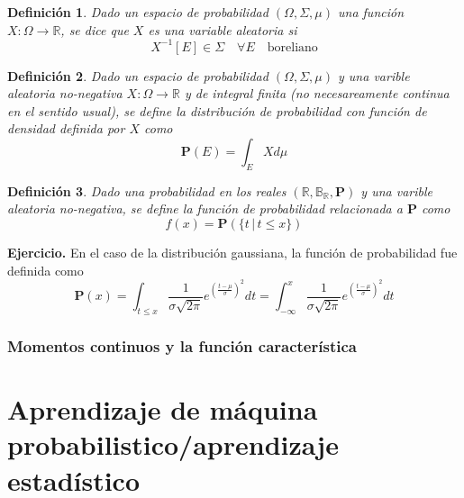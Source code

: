 \documentclass[letterpaper]{book}
\newtheorem{def.}{Definici\'on}[section]
\newcommand{\prob}{\textbf{P}}
\newcommand{\eje}{{\newline \noindent \sc \textbf{Ejercicio. }}}
\newcommand{\om}{\ensuremath{\Omega}}
\newcommand{\sig}{\ensuremath{\Sigma}}
\newcommand{\re}{\ensuremath{\mathbb R }}
\begin{document}
\begin{def.}
Dado un espacio de probabilidad \((\om,\sig,\mu)\) una función \(X:\om\rightarrow \re\), se dice que \(X\) es una variable aleatoria si
\[
    X^{-1}[E]\in\sig\quad\forall E \quad\text{boreliano}
\]
\end{def.}
\begin{def.}
Dado un espacio de probabilidad \((\om,\sig,\mu)\) y una varible aleatoria no-negativa \(X:\om\rightarrow \re\) y de integral finita (no necesareamente continua en el sentido usual), se define la \emph{distribución de probabilidad} con función de densidad definida por \(X\) como
\[
\prob(E)=\int_E Xd\mu
\]
\end{def.}

\begin{def.}
Dado una probabilidad en los reales \((\re,\mathbb{B}_{\re},\prob)\) y una varible aleatoria no-negativa, se define la \emph{función de probabilidad} relacionada a \(\prob\) como
\[
        f(x)=\prob(\{t\,|\,t\leq x\})
\]
\end{def.}
\eje En el caso de la distribución gaussiana, la función de probabilidad fue definida como
\[
    \prob(x)=\int_{t\leq x}\frac{1}{\sigma\sqrt{2\pi}}e^{(\frac{t-\mu}{\sigma})^2}dt =
    \int_{-\infty}^{x}\frac{1}{\sigma\sqrt{2\pi}}e^{(\frac{t-\mu}{\sigma})^2}dt
\]
\section{Momentos continuos y la función característica}
\label{sec:orgc6d7542}
\part{Aprendizaje de máquina probabilistico/aprendizaje estadístico}
\label{sec:orgc79f0a8}
\end{document}
